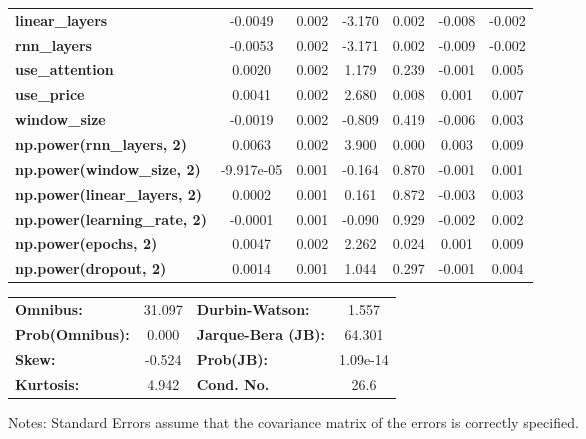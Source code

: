 \begin{center}
\begin{tabular}{lcccccc}
\textbf{linear\_layers}              &      -0.0049  &        0.002     &    -3.170  &         0.002        &       -0.008    &       -0.002     \\
\textbf{rnn\_layers}                 &      -0.0053  &        0.002     &    -3.171  &         0.002        &       -0.009    &       -0.002     \\
\textbf{use\_attention}              &       0.0020  &        0.002     &     1.179  &         0.239        &       -0.001    &        0.005     \\
\textbf{use\_price}                  &       0.0041  &        0.002     &     2.680  &         0.008        &        0.001    &        0.007     \\
\textbf{window\_size}                &      -0.0019  &        0.002     &    -0.809  &         0.419        &       -0.006    &        0.003     \\
\textbf{np.power(rnn\_layers, 2)}    &       0.0063  &        0.002     &     3.900  &         0.000        &        0.003    &        0.009     \\
\textbf{np.power(window\_size, 2)}   &   -9.917e-05  &        0.001     &    -0.164  &         0.870        &       -0.001    &        0.001     \\
\textbf{np.power(linear\_layers, 2)} &       0.0002  &        0.001     &     0.161  &         0.872        &       -0.003    &        0.003     \\
\textbf{np.power(learning\_rate, 2)} &      -0.0001  &        0.001     &    -0.090  &         0.929        &       -0.002    &        0.002     \\
\textbf{np.power(epochs, 2)}         &       0.0047  &        0.002     &     2.262  &         0.024        &        0.001    &        0.009     \\
\textbf{np.power(dropout, 2)}        &       0.0014  &        0.001     &     1.044  &         0.297        &       -0.001    &        0.004     \\
\bottomrule
\end{tabular}
\begin{tabular}{lclc}
\textbf{Omnibus:}       & 31.097 & \textbf{  Durbin-Watson:     } &    1.557  \\
\textbf{Prob(Omnibus):} &  0.000 & \textbf{  Jarque-Bera (JB):  } &   64.301  \\
\textbf{Skew:}          & -0.524 & \textbf{  Prob(JB):          } & 1.09e-14  \\
\textbf{Kurtosis:}      &  4.942 & \textbf{  Cond. No.          } &     26.6  \\
\bottomrule
\end{tabular}
\end{center}

Notes: \newline
 [1] Standard Errors assume that the covariance matrix of the errors is correctly specified.